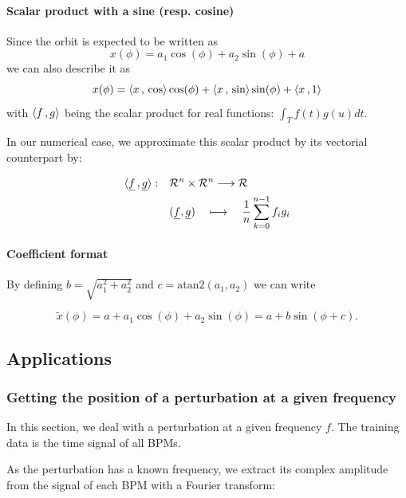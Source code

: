\paragraph{Scalar product with a sine (resp. cosine)}
Since the orbit is expected to be written as
\begin{equation*}
x(\phi) = a_1 \cos(\phi) + a_2 \sin(\phi) + a
\end{equation*}
we can also describe it as
\begin{equation}
x(\phi) = \langle x {\,,\,} \cos \rangle \cos(\phi) + \langle x {\,,\,} \sin \rangle \sin(\phi) + \langle x {\,,\,} 1 \rangle
\end{equation}
with $\langle f {\,,\,} g \rangle$ being the scalar product for real functions: $\int_T f(t)g(u)dt$.

In our numerical case, we approximate this scalar product by its vectorial counterpart by:

\begin{align*}
\langle \underline{f} {\,,\,} \underline{g} \rangle: \quad
 &\mathcal{R}^n \times \mathcal{R}^n \longrightarrow \mathcal{R} \\
 & (\underline{f},\underline{g}) \quad\longmapsto \quad \frac{1}{n}\sum\limits_{k=0}^{n-1} f_i g_i
\end{align*}

\paragraph{Coefficient format}
By defining $b = \sqrt{a_1^2+a_2^2}$ and $c = \mathrm{atan2}(a_1, a_2)$  we can write

\begin{equation*}
\tilde{x}(\phi) = a + a_1 \cos(\phi) + a_2 \sin(\phi) = a + b \sin(\phi + c).
\end{equation*} 

\subsection{Applications}
\subsubsection{Getting the position of a perturbation at a given frequency}
In this section, we deal with a perturbation at a given frequency $f$. The training data is the time signal of all BPMs.

As the perturbation has a known frequency, we extract its complex amplitude from the signal of each BPM with a Fourier transform:

